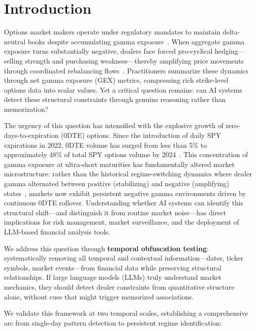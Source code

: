 \section{Introduction}
\label{sec:introduction}

Options market makers operate under regulatory mandates to maintain delta-neutral books despite accumulating gamma exposure~\cite{sec15c31}. When aggregate gamma exposure turns substantially negative, dealers face forced pro-cyclical hedging---selling strength and purchasing weakness---thereby amplifying price movements through coordinated rebalancing flows~\cite{ni2005stock,garleanu2009demand}. Practitioners summarize these dynamics through net gamma exposure (GEX) metrics, compressing rich strike-level options data into scalar values. Yet a critical question remains: can AI systems detect these structural constraints through genuine reasoning rather than memorization?

The urgency of this question has intensified with the explosive growth of zero-days-to-expiration (0DTE) options. Since the introduction of daily SPY expirations in 2022, 0DTE volume has surged from less than 5\% to approximately 48\% of total SPY options volume by 2024~\cite{cboe2024zero,dim2025zero}. This concentration of gamma exposure at ultra-short maturities has fundamentally altered market microstructure: rather than the historical regime-switching dynamics where dealer gamma alternated between positive (stabilizing) and negative (amplifying) states~\cite{ni2005stock,garleanu2009demand}, markets now exhibit persistent negative gamma environments driven by continuous 0DTE rollover. Understanding whether AI systems can identify this structural shift---and distinguish it from routine market noise---has direct implications for risk management, market surveillance, and the deployment of LLM-based financial analysis tools.

We address this question through \textbf{temporal obfuscation testing}: systematically removing all temporal and contextual information---dates, ticker symbols, market events---from financial data while preserving structural relationships. If large language models (LLMs) truly understand market mechanics, they should detect dealer constraints from quantitative structure alone, without cues that might trigger memorized associations.

We validate this framework at two temporal scales, establishing a comprehensive arc from single-day pattern detection to persistent regime identification:

